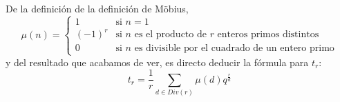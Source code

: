 \documentclass[a4paper, 11pt]{article}
\begin{document}
\begin{solucion}
\begin{apartado}
          De la definición de la definición de Möbius,
          \[
          \mu(n) = \begin{cases}
              1 & \textrm{si $n=1$}\\
              (-1)^r & \textrm{si $n$ es el producto de $r$ enteros primos distintos}\\
              0 & \textrm{si $n$ es divisible por el cuadrado de un entero primo}
          \end{cases}
          \]
          y del resultado que acabamos de ver, es directo deducir la fórmula para $t_r$:
          \[
          t_r = \frac{1}{r}\sum_{d\in Div(r)}\mu(d)q^\frac{r}{d}
          \]
      \end{apartado}
  \end{solucion}
\end{document}
